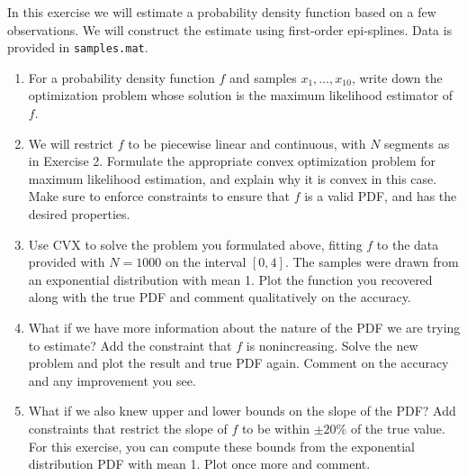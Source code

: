 \begin{exercise}\rm
In this exercise we will estimate a probability density function based on a few observations. We will construct the estimate using first-order epi-splines. Data is provided in \texttt{samples.mat}.

\begin{enumerate}
\item For a probability density function $f$ and samples $x_1,\ldots,x_{10}$, write down the optimization problem whose solution is the maximum likelihood estimator of $f$.

\item We will restrict $f$ to be piecewise linear and continuous, with $N$ segments as in Exercise 2. Formulate the appropriate convex optimization problem for maximum likelihood estimation, and explain why it is convex in this case. Make sure to enforce constraints to ensure that $f$ is a valid PDF, and has the desired properties.

\item Use CVX to solve the problem you formulated above, fitting $f$ to the data provided with $N = 1000$ on the interval $[0,4]$. The samples were drawn from an exponential distribution with mean 1. Plot the function you recovered along with the true PDF and comment qualitatively on the accuracy.

\item What if we have more information about the nature of the PDF we are trying to estimate? Add the constraint that $f$ is nonincreasing. Solve the new problem and plot the result and true PDF again. Comment on the accuracy and any improvement you see.

\item What if we also knew upper and lower bounds on the slope of the PDF? Add constraints that restrict the slope of $f$ to be within $\pm 20\%$ of the true value. For this exercise, you can compute these bounds from the exponential distribution PDF with mean 1. Plot once more and comment.

\end{enumerate}

\end{exercise}
